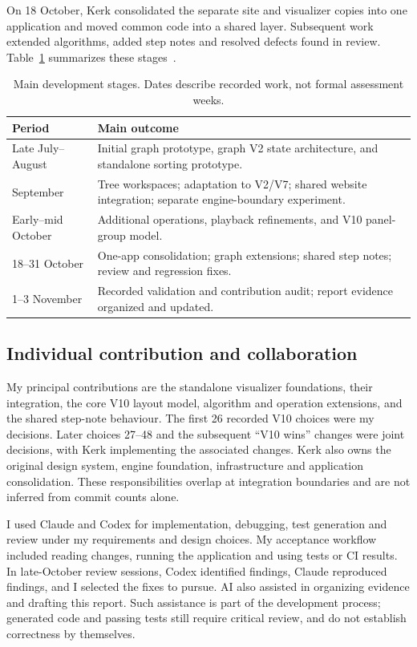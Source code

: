 \documentclass[11pt,a4paper]{article}
\begin{document}
On 18 October, Kerk consolidated the separate site and visualizer copies into one application and moved common code into a shared layer. Subsequent work extended algorithms, added step notes and resolved defects found in review. Table~\ref{tab:timeline} summarizes these stages~\cite{evidence,architecture}.

\begin{table}[tbp]\small\centering
\caption{Main development stages. Dates describe recorded work, not formal assessment weeks.}\label{tab:timeline}
\begin{tabularx}{\linewidth}{@{}p{27mm}X@{}}\toprule
Period & Main outcome\\\midrule
Late July--August & Initial graph prototype, graph V2 state architecture, and standalone sorting prototype.\\
September & Tree workspaces; adaptation to V2/V7; shared website integration; separate engine-boundary experiment.\\
Early--mid October & Additional operations, playback refinements, and V10 panel-group model.\\
18--31 October & One-app consolidation; graph extensions; shared step notes; review and regression fixes.\\
1--3 November & Recorded validation and contribution audit; report evidence organized and updated.\\\bottomrule
\end{tabularx}
\end{table}

\subsection{Individual contribution and collaboration}
My principal contributions are the standalone visualizer foundations, their integration, the core V10 layout model, algorithm and operation extensions, and the shared step-note behaviour. The first 26 recorded V10 choices were my decisions. Later choices 27--48 and the subsequent ``V10 wins'' changes were joint decisions, with Kerk implementing the associated changes. Kerk also owns the original design system, engine foundation, infrastructure and application consolidation. These responsibilities overlap at integration boundaries and are not inferred from commit counts alone.

I used Claude and Codex for implementation, debugging, test generation and review under my requirements and design choices. My acceptance workflow included reading changes, running the application and using tests or CI results. In late-October review sessions, Codex identified findings, Claude reproduced findings, and I selected the fixes to pursue. AI also assisted in organizing evidence and drafting this report. Such assistance is part of the development process; generated code and passing tests still require critical review, and do not establish correctness by themselves.
\end{document}
